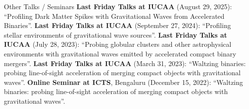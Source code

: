 \begin{rubric}{Other Talks /  Seminars}
\entry*[] \textbf{Last Friday Talks at IUCAA} (August 29, 2025): ``Profiling Dark Matter Spikes with Gravitational Waves from Accelerated Binaries''.
%
\entry*[] \textbf{Last Friday Talks at IUCAA} (September 27, 2024): ``Profiling stellar environments of gravitational wave sources''.
%
\entry*[] \textbf{Last Friday Talks at IUCAA} (July 28, 2023): ``Probing globular clusters and other astrophysical environments with gravitational waves emitted by accelerated compact binary mergers''.
%
\entry*[] \textbf{Last Friday Talks at IUCAA} (March 31, 2023): ``Waltzing binaries: probing line-of-sight acceleration of merging compact objects with gravitational waves''.
%
\entry*[] \textbf{Online Seminar at ICTS}, Bengaluru (December 15, 2022): ``Waltzing binaries: probing line-of-sight acceleration of merging compact objects with gravitational waves''.

\end{rubric}
